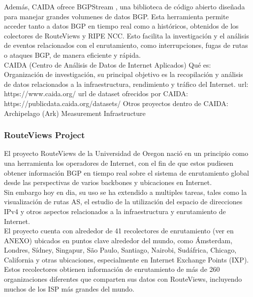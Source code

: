 Además, CAIDA ofrece BGPStream \cite{BGPStream}, una biblioteca de código abierto diseñada para manejar grandes volumenes de datos BGP. Esta herramienta permite acceder tanto a datos BGP en tiempo real como a históricos, obtenidos de los colectores de RouteViews y RIPE NCC. Esto facilita la investigación y el análisis de eventos relacionados con el enrutamiento, como interrupciones, fugas de rutas o ataques BGP, de manera eficiente y rápida.\\


CAIDA (Centro de Análisis de Datos de Internet Aplicados)
Qué es: Organización de investigación, su principal objetivo es la recopilación y análisis de datos relacionados a la infraestructura, rendimiento y tráfico del Internet.
url: https://www.caida.org/
url de dataset ofrecidos por CAIDA: https://publicdata.caida.org/datasets/
Otros proyectos dentro de CAIDA:
Archipelago (Ark) Measurement Infrastructure








\subsubsection{RouteViews Project} \label{sec:anexo_routeviews_project}



El proyecto RouteViews \cite{RouteViewsProject} de la Universidad de Oregon nació en un principio como una herramienta los operadores de Internet, con el fin de que estos pudiesen obtener información BGP en tiempo real sobre el sistema de enrutamiento global desde las perspectivas de varios backbones y ubicaciones en Internet. \\

Sin embargo hoy en dia, su uso se ha extendido a multiples tareas, tales como la visualización de rutas AS, el estudio de la utilización del espacio de direcciones IPv4 y  otros aspectos relacionados a la infraestructura y enrutamiento de Internet. \\


El proyecto cuenta con alrededor de 41  recolectores de enrutamiento  (ver en ANEXO)  ubicados en puntos clave alrededor del mundo, como Ámsterdam, Londres, Sídney, Singapur, São Paulo, Santiago, Nairobi, Sudáfrica, Chicago, California y otras ubicaciones, especialmente en Internet Exchange Points (IXP). Estos recolectores obtienen información de enrutamiento de más de 260 organizaciones diferentes que comparten sus datos  con RouteViews, incluyendo muchos de los ISP más grandes del mundo.\\

